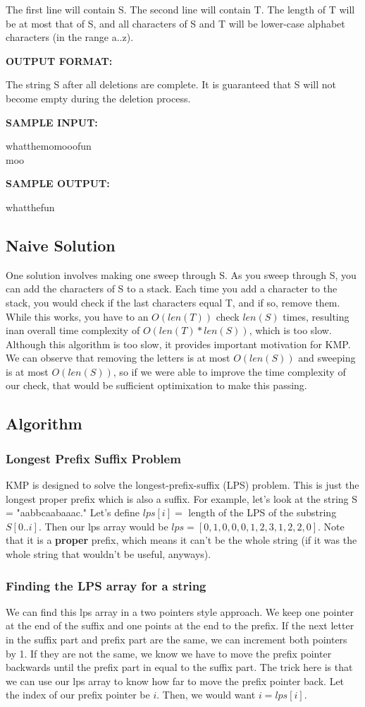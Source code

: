 \documentclass{article}
\begin{document}
The first line will contain S. The second line will contain T. The 
length of T will be at most that of S, and all characters of S and 
T will be lower-case alphabet characters (in the range a..z).

{\bf OUTPUT FORMAT:}

The string S after all deletions are complete. It is guaranteed 
that S will not become empty during the deletion process.

{\bf SAMPLE INPUT:}

whatthemomooofun \\
\indent moo

{\bf SAMPLE OUTPUT:}

whatthefun

\subsection{Naive Solution}
One solution involves making one sweep through S. As you sweep through S, you can add the characters of S to a stack. Each time you add a character to the stack, you would check if the last characters equal T, and if so, remove them. While this works, you have to an \(O(len(T))\) check \(len(S)\) times, resulting inan overall time complexity of \(O(len(T)*len(S))\), which is too slow. \\ 
\indent Although this algorithm is too slow, it provides important motivation for KMP. We can observe that removing the letters is at most \(O(len(S))\) and sweeping is at most \(O(len(S))\), so if we were able to improve the time complexity of our check, that would be sufficient optimixation to make this passing. 

\subsection{Algorithm}
\subsubsection{Longest Prefix Suffix Problem}
KMP is designed to solve the longest-prefix-suffix (LPS) problem. This is just the longest proper prefix which is also a suffix. For example, let's look at the string S = "aabbcaabaaac." Let's define \(lps[i] =\) length of the LPS of the substring \(S[0..i]\). Then our lps array would be \(lps = [0,1,0,0,0,1,2,3,1,2,2,0]\). Note that it is a {\bf proper} prefix, which means it can't be the whole string (if it was the whole string that wouldn't be useful, anyways). 
\subsubsection{Finding the LPS array for a string}
We can find this lps array in a two pointers style approach. We keep one pointer at the end of the suffix and one points at the end to the prefix. If the next letter in the suffix part and prefix part are the same, we can increment both pointers by 1. If they are not the same, we know we have to move the prefix pointer backwards until the prefix part in equal to the suffix part. The trick here is that we can use our lps array to know how far to move the prefix pointer back. Let the index of our prefix pointer be \(i\). Then, we would want \(i=lps[i]\).
\end{document}
